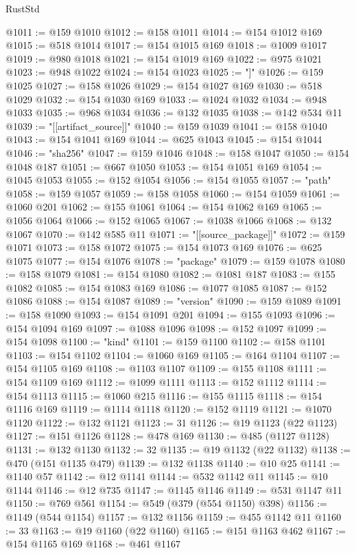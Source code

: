 \begin{lexlean}{RustStd}
\begin{coremodule}
@1011 := @159 @1010
@1012 := @158 @1011
@1014 := @154 @1012 @169
@1015 := @518 @1014
@1017 := @154 @1015 @169
@1018 := @1009 @1017
@1019 := @980 @1018
@1021 := @154 @1019 @169
@1022 := @975 @1021
@1023 := @948 @1022
@1024 := @154 @1023
@1025 := "]"
@1026 := @159 @1025
@1027 := @158 @1026
@1029 := @154 @1027 @169
@1030 := @518 @1029
@1032 := @154 @1030 @169
@1033 := @1024 @1032
@1034 := @948 @1033
@1035 := @968 @1034
@1036 := @132 @1035
@1038 := @142 @534 @11
@1039 := "[[artifact_source]]"
@1040 := @159 @1039
@1041 := @158 @1040
@1043 := @154 @1041 @169
@1044 := @625 @1043
@1045 := @154 @1044
@1046 := "sha256"
@1047 := @159 @1046
@1048 := @158 @1047
@1050 := @154 @1048 @187
@1051 := @667 @1050
@1053 := @154 @1051 @169
@1054 := @1045 @1053
@1055 := @152 @1054
@1056 := @154 @1055
@1057 := "path"
@1058 := @159 @1057
@1059 := @158 @1058
@1060 := @154 @1059
@1061 := @1060 @201
@1062 := @155 @1061
@1064 := @154 @1062 @169
@1065 := @1056 @1064
@1066 := @152 @1065
@1067 := @1038 @1066
@1068 := @132 @1067
@1070 := @142 @585 @11
@1071 := "[[source_package]]"
@1072 := @159 @1071
@1073 := @158 @1072
@1075 := @154 @1073 @169
@1076 := @625 @1075
@1077 := @154 @1076
@1078 := "package"
@1079 := @159 @1078
@1080 := @158 @1079
@1081 := @154 @1080
@1082 := @1081 @187
@1083 := @155 @1082
@1085 := @154 @1083 @169
@1086 := @1077 @1085
@1087 := @152 @1086
@1088 := @154 @1087
@1089 := "version"
@1090 := @159 @1089
@1091 := @158 @1090
@1093 := @154 @1091 @201
@1094 := @155 @1093
@1096 := @154 @1094 @169
@1097 := @1088 @1096
@1098 := @152 @1097
@1099 := @154 @1098
@1100 := "kind"
@1101 := @159 @1100
@1102 := @158 @1101
@1103 := @154 @1102
@1104 := @1060 @169
@1105 := @164 @1104
@1107 := @154 @1105 @169
@1108 := @1103 @1107
@1109 := @155 @1108
@1111 := @154 @1109 @169
@1112 := @1099 @1111
@1113 := @152 @1112
@1114 := @154 @1113
@1115 := @1060 @215
@1116 := @155 @1115
@1118 := @154 @1116 @169
@1119 := @1114 @1118
@1120 := @152 @1119
@1121 := @1070 @1120
@1122 := @132 @1121
@1123 := 31
@1126 := @19 @1123 (@22 @1123)
@1127 := @151 @1126
@1128 := @478 @169
@1130 := @485 (@1127 @1128)
@1131 := @132 @1130
@1132 := 32
@1135 := @19 @1132 (@22 @1132)
@1138 := @470 (@151 @1135 @479)
@1139 := @132 @1138
@1140 := @10 @25
@1141 := @1140 @57
@1142 := @12 @1141
@1144 := @532 @1142 @11
@1145 := @10 @1144
@1146 := @12 @735
@1147 := @1145 @1146
@1149 := @531 @1147 @11
@1150 := @769 @561
@1154 := @549 (@379 (@554 @1150) @398)
@1156 := @1149 (@544 @1154)
@1157 := @132 @1156
@1159 := @455 @1142 @11
@1160 := 33
@1163 := @19 @1160 (@22 @1160)
@1165 := @151 @1163 @462
@1167 := @154 @1165 @169
@1168 := @461 @1167

\end{coremodule}
\end{lexlean}
